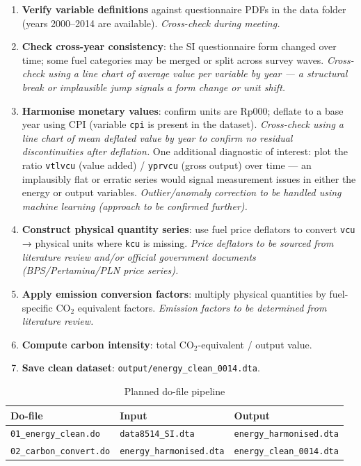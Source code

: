 \documentclass[11pt, a4paper]{article}
\begin{document}
\begin{enumerate}
  \item \textbf{Verify variable definitions} against questionnaire PDFs in the data folder
        (years 2000–2014 are available). \textit{Cross-check during meeting.}
  \item \textbf{Check cross-year consistency}: the SI questionnaire form changed over time;
        some fuel categories may be merged or split across survey waves.
        \textit{Cross-check using a line chart of average value per variable by year ---
        a structural break or implausible jump signals a form change or unit shift.}
  \item \textbf{Harmonise monetary values}: confirm units are Rp000; deflate to a base year
        using CPI (variable \texttt{cpi} is present in the dataset).
        \textit{Cross-check using a line chart of mean deflated value by year to confirm
        no residual discontinuities after deflation.}
        One additional diagnostic of interest: plot the ratio
        \texttt{vtlvcu} (value added) / \texttt{yprvcu} (gross output) over time ---
        an implausibly flat or erratic series would signal measurement issues in either
        the energy or output variables.
        \textit{Outlier/anomaly correction to be handled using machine learning
        (approach to be confirmed further).}
  \item \textbf{Construct physical quantity series}: use fuel price deflators to convert
        \texttt{vcu} → physical units where \texttt{kcu} is missing.
        \textit{Price deflators to be sourced from literature review and/or official
        government documents (BPS/Pertamina/PLN price series).}
  \item \textbf{Apply emission conversion factors}: multiply physical quantities by
        fuel-specific $\text{CO}_2$ equivalent factors.
        \textit{Emission factors to be determined from literature review.}
  \item \textbf{Compute carbon intensity}: total $\text{CO}_2$-equivalent / output value.
  \item \textbf{Save clean dataset}: \texttt{output/energy\_clean\_0014.dta}.
\end{enumerate}

\begin{table}[htbp]
\centering
\caption{Planned do-file pipeline}
\begin{tabular}{lll}
\toprule
\textbf{Do-file} & \textbf{Input} & \textbf{Output} \\
\midrule
\texttt{01\_energy\_clean.do}   & \texttt{data8514\_SI.dta} & \texttt{energy\_harmonised.dta} \\
\texttt{02\_carbon\_convert.do} & \texttt{energy\_harmonised.dta} & \texttt{energy\_clean\_0014.dta} \\
\bottomrule
\end{tabular}
\end{table}
\end{document}
